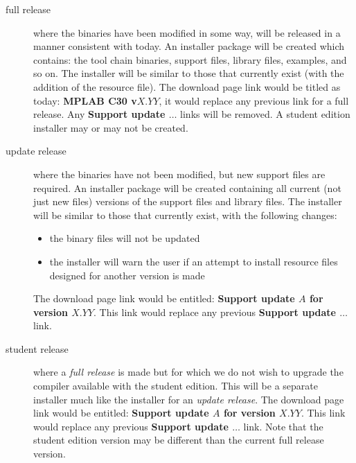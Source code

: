 \documentclass{article}
\begin{document}
  \begin{description}
  \item [full release]    where the binaries have been modified in some way, 
                          will be released in a manner consistent with today.  
                          An installer package will be created which contains: 
                          the tool chain binaries, support files, library files,
                          examples, and so on.  The installer will be similar
                          to those that currently exist (with the addition of
                          the resource file).  The download page link would
                          be titled as today: \textbf{MPLAB C30 v$X.YY$}, it
                          would replace any previous link for a full release. 
                          Any \textbf{Support update $\ldots$} links will be
                          removed. A student edition installer may or may not
                          be created.

  \item [update release]  where the binaries have not been modified, but new
                          support files are required.  An installer package
                          will be created containing all current (not just
                          new files) versions of the support files and library
                          files.  The installer will be similar to those that
                          currently exist, with the following changes:
                          \begin{itemize}
                             \item the binary files will not be updated
                             \item the installer will warn the user if an 
                                   attempt to install resource files designed
                                   for another version is made
                          \end{itemize}
                          The download page link would be entitled:
                          \textbf{Support update $A$ for version $X.YY$}.
                          This link would replace any previous \textbf{Support 
                          update $\ldots$} link.

  \item [student release] where a \textit{full release} is made but for
                          which we do not wish to upgrade the compiler 
                          available with the student edition.  This will be a 
                          separate installer much like the installer for
                          an \textit{update release}.  
                          The download page link would be entitled:
                          \textbf{Support update $A$ for version $X.YY$}.
                          This link would replace any previous \textbf{Support 
                          update $\ldots$} link.  Note that the student
                          edition version may be different than the current
                          full release version.
  \end{description}
\end{document}
